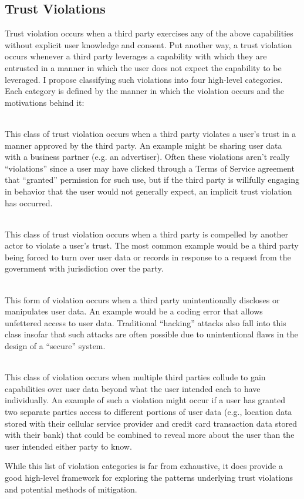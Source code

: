 \subsection{Trust Violations}

Trust violation occurs when a third party exercises any of the above
capabilities without explicit user knowledge and consent. Put another
way, a trust violation occurs whenever a third party leverages a
capability with which they are entrusted in a manner in which the user
does not expect the capability to be leveraged. I propose classifying
such violations into four high-level categories. Each category is
defined by the manner in which the violation occurs and the
motivations behind it:

\begin{packed_desc}
\item[Implicit (P-Violation):] \hfill \\ This class of trust violation
  occurs when a third party violates a user's trust in a manner
  approved by the third party. An example might be sharing user data
  with a business partner (e.g. an advertiser). Often these violations
  aren't really ``violations'' since a user may have clicked through a
  Terms of Service agreement that ``granted'' permission for such use,
  but if the third party is willfully engaging in behavior that the
  user would not generally expect, an implicit trust violation has
  occurred.
\item[Compelled (C-Violation):] \hfill \\ This class of trust
  violation occurs when a third party is compelled by another actor to
  violate a user's trust. The most common example would be a third
  party being forced to turn over user data or records in response to
  a request from the government with jurisdiction over the party.
\item[Unintentional (U-Violation):] \hfill \\ This form of violation
  occurs when a third party unintentionally discloses or manipulates
  user data. An example would be a coding error that allows unfettered
  access to user data. Traditional ``hacking'' attacks also fall into
  this class insofar that such attacks are often possible due to
  unintentional flaws in the design of a ``secure'' system.
\item[Colluding (L-Violation):] \hfill \\ This class of violation
  occurs when multiple third parties collude to gain capabilities over
  user data beyond what the user intended each to have
  individually. An example of such a violation might occur if a user
  has granted two separate parties access to different portions of
  user data (e.g., location data stored with their cellular service
  provider and credit card transaction data stored with their bank)
  that could be combined to reveal more about the user than the user
  intended either party to know.
\end{packed_desc}

While this list of violation categories is far from exhaustive, it
does provide a good high-level framework for exploring the patterns
underlying trust violations and potential methods of mitigation.
